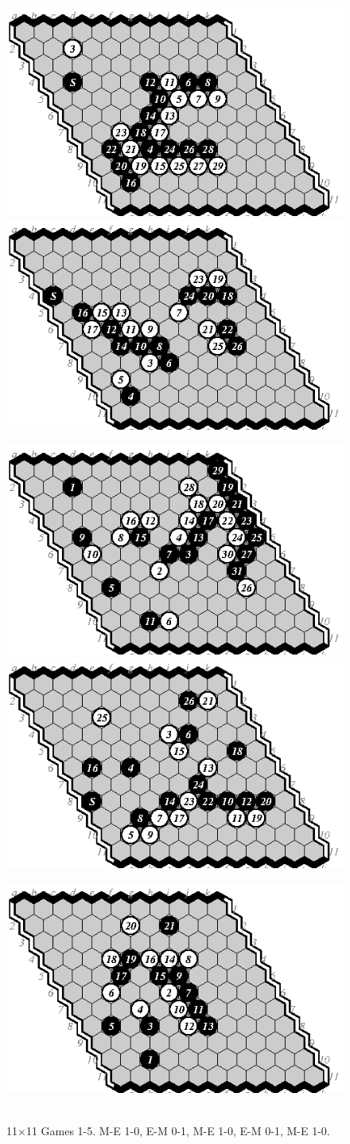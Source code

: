 \documentclass{IOS-Book-Article}
\begin{document}
\begin{figure}
\noindent\includegraphics[width=.58\columnwidth]{pix/11-01-me}\hspace*{-.14\columnwidth}\includegraphics[width=.58\columnwidth]{pix/11-02-em}
\vspace*{.2cm}

\noindent\includegraphics[width=.58\columnwidth]{pix/11-03-me}\hspace*{-.14\columnwidth}\includegraphics[width=.58\columnwidth]{pix/11-04-em}
\vspace*{.2cm}

\noindent\hfill\includegraphics[width=.58\columnwidth]{pix/11-05-me}\hfill\ 
\caption{11$\times$11 Games 1-5. M-E 1-0, E-M 0-1, M-E 1-0, E-M 0-1, M-E 1-0.}
\label{fig:11}
\end{figure}
\end{document}
